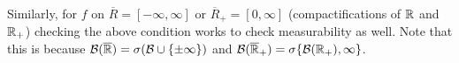 Similarly, for $f$ on $\overline{R} = [-\infty, \infty]$ or $\overline{R}_{+} = [0, \infty]$ (compactifications of $\mathbb{R}$ and $\mathbb{R}_{+}$) checking the above condition works to check measurability as well. Note that this is because $\mathcal{B}(\overline{\mathbb{R}}) = \sigma(\mathcal{B} \cup \{\pm \infty\})$ and $\mathcal{B}(\overline{\mathbb{R}}_{+}) = \sigma\{\mathcal{B}(\mathbb{R}_{+}), \infty\}$. 